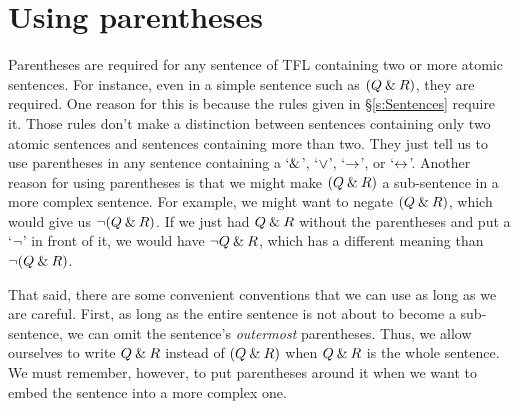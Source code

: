 


\section{Using parentheses}
\label{TFLconventions}

Parentheses are required for any sentence of TFL containing two or more atomic sentences. For instance, even in a simple sentence such as $(Q \mathbin{\&} R)$, they are required. One reason for this is because the rules given in \S\ref{s:Sentences} require it. Those rules don't make a distinction between sentences containing only two atomic sentences and sentences containing more than two. They just tell us to use parentheses in any sentence containing a `$\mathbin{\&}$', `$\vee$', `$\rightarrow$', or `$\leftrightarrow$'. Another reason for using parentheses is that we might make $(Q \mathbin{\&} R)$ a sub-sentence in a more complex sentence. For example, we might want to negate $(Q \mathbin{\&} R)$, which would give us ${\neg}(Q \mathbin{\&} R)$. If we just had $Q \mathbin{\&} R$ without the parentheses and put a `${\neg}$' in front of it, we would have ${\neg} Q \mathbin{\&} R$, which has a different meaning than ${\neg}(Q\mathbin{\&} R)$. 

That said, there are some convenient conventions that we can use as long as we are careful. First, as long as the entire sentence is not about to become a sub-sentence,  we can omit the sentence's \emph{outermost} parentheses. Thus, we allow ourselves to write $Q \mathbin{\&} R$ instead of $(Q \mathbin{\&} R)$ when $Q \mathbin{\&} R$ is the whole sentence. We must remember, however, to put parentheses around it when we want to embed the sentence into a more complex one.


